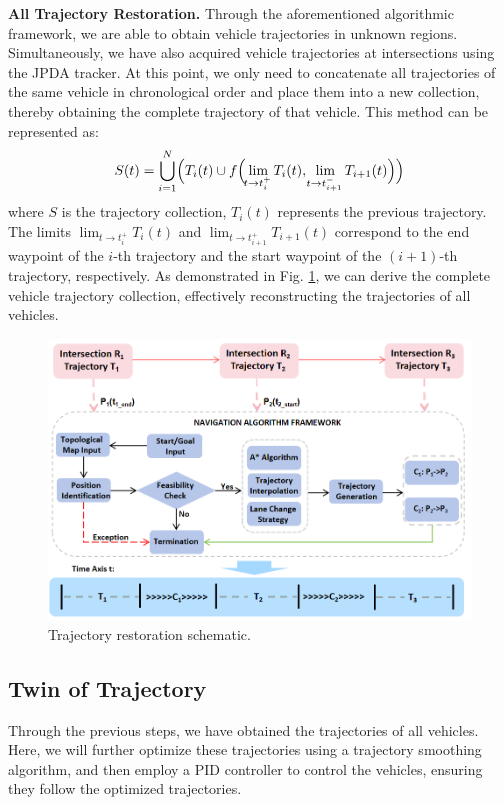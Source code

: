 \documentclass[lettersize,journal]{IEEEtran}
\begin{document}
\textbf{All Trajectory Restoration.}
Through the aforementioned algorithmic framework, we are able to obtain vehicle trajectories in unknown regions. 
Simultaneously, we have also acquired vehicle trajectories at intersections using the JPDA tracker. 
At this point, we only need to concatenate all trajectories of the same vehicle in chronological order and place them into a new collection, thereby obtaining the complete trajectory of that vehicle. 
This method can be represented as: 
\begin{align}
	S(t) = \bigcup_{i=1}^{N} \Bigl( T_i(t) \cup f\Bigl( \lim_{\!t \to t_i^+} T_i(t), \lim_{\!t \to t_{i+1}^-} T_{i+1}(t) \Bigr) \Bigr)
\end{align}
where \(S\) is the trajectory collection, \(T_i(t)\) represents the previous trajectory. 
The limits \(\lim_{t \to t_i^+} T_i(t)\) and \(\lim_{t \to t_{i+1}^+} T_{i+1}(t)\) correspond to the end waypoint of the \(i\)-th trajectory and the start waypoint of the \((i+1)\)-th trajectory, respectively.
As demonstrated in Fig. \ref{fig:5}, we can derive the complete vehicle trajectory collection, effectively reconstructing the trajectories of all vehicles.
\begin{figure}[t]
	\centering
	\includegraphics[width=\linewidth]{picture/picture5.png} 
	\caption{Trajectory restoration schematic.} 
	\label{fig:5} 
\end{figure}

\subsection{Twin of Trajectory}

Through the previous steps, we have obtained the trajectories of all vehicles. 
Here, we will further optimize these trajectories using a trajectory smoothing algorithm, and then employ a PID controller to control the vehicles, ensuring they follow the optimized trajectories\cite{Alpher22d}. 
\end{document}
